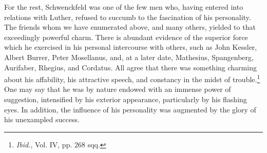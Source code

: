 For the rest, Schwenckfeld was one of the few men who, having
entered into relations with Luther, refused to succumb to the fascination
of his personality. The friends whom we have enumerated
above, and many others, yielded to that exceedingly powerful charm.
There is abundant evidence of the superior force which he exercised
in his personal intercourse with others, such as John Kessler, Albert
Burrer, Peter Mosellanus, and, at a later date, Mathesius, Spangenberg,
Aurifaber, Rhegius, and Cordatus. All agree that there was
something charming about his affability, his attractive speech, and
constancy in the midst of trouble.\footnote{\textit{Ibid.}, Vol. IV, pp. 268 sqq.}
One may say that he was by
nature endowed with an immense power of suggestion, intensified by
his exterior appearance, particularly by his flashing eyes. In addition,
the influence of his personality was augmented by the glory of his
unexampled success.
